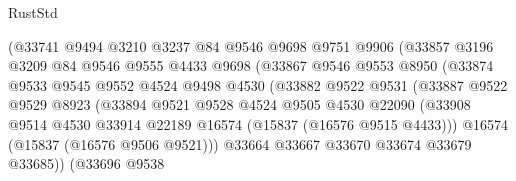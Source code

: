 \begin{lexlean}{RustStd}
\begin{coremodule}
{\begin{coremodule}
{{{{{{{{{{{{{{{{{{{{{{{{{{{{{{{{{{{{{{{{{{{{{{{{{{{{{{{{{{{{                            (@33741
                              @9494
                              @3210
                              @3237
                              @84
                              @9546
                              @9698
                              @9751
                              @9906
                              (@33857
                                @3196
                                @3209
                                @84
                                @9546
                                @9555
                                @4433
                                @9698
                                (@33867
                                  @9546
                                  @9553
                                  @8950
                                  (@33874
                                    @9533
                                    @9545
                                    @9552
                                    @4524
                                    @9498
                                    @4530
                                    (@33882
                                      @9522
                                      @9531
                                      (@33887
                                        @9522
                                        @9529
                                        @8923
                                        (@33894
                                          @9521
                                          @9528
                                          @4524
                                          @9505
                                          @4530
                                          @22090
                                          (@33908
                                            @9514
                                            @4530
                                            @33914
                                            @22189
                                            @16574
                                            (@15837 (@16576 @9515 @4433)))
                                          @16574
                                          (@15837 (@16576 @9506 @9521)))
                                        @33664
                                        @33667
                                        @33670
                                        @33674
                                        @33679
                                        @33685))
                                    (@33696
                                      @9538
}}}}}}}}}}}}}}}}}}}}}}}}}}}}}}}}}}}}}}}}}}}}}}}}}}}}}}}}}}}}
\end{coremodule}}
\end{coremodule}
\end{lexlean}
